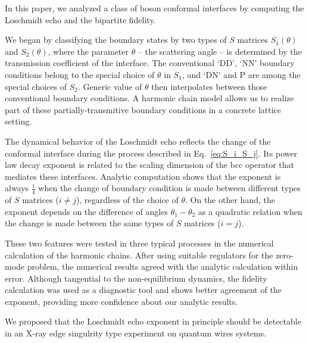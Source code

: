 
In this paper, we analyzed a class of boson conformal interfaces by computing the Loschmidt echo and the bipartite fidelity. 

We began by classifying the boundary states by two types of $S$ matrices $S_1(\theta)$ and $S_2(\theta)$, where the parameter $\theta$ -- the scattering angle -- is determined by the transmission coefficient of the interface. The conventional `DD', `NN' boundary conditions belong to the special choice of $\theta$ in $S_1$, and `DN' and P are among the special choices of $S_2$. Generic value of $\theta$ then interpolates between those conventional boundary conditions. A harmonic chain model allows us to realize part of these partially-transmitive boundary conditions in a concrete lattice setting. 

The dynamical behavior of the Loschmidt echo reflects the change of the conformal interface during the process described in Eq.~\eqref{eq:S_i_S_j}.
Its power law decay exponent is related to the scaling dimension of the bcc operator that mediates these interfaces. Analytic computation shows that the exponent is always $\frac{1}{4}$ when the change of boundary condition is made between different types of $S$ matrices ($i \ne j$), regardless of the choice of $\theta$. On the other hand, the exponent depends on the difference of angles $\theta_1 - \theta_2$ as a quadratic relation when the change is made between the same types of $S$ matrices ($i = j$).

These two features were tested in three typical processes in the numerical calculation of the harmonic chains. After using suitable regulators for the zero-mode problem, the numerical results agreed with the analytic calculation within error. Although tangential to the non-equilibrium dynamics, the fidelity calculation was used as a diagnostic tool and shows better agreement of the exponent, providing more confidence about our analytic results. 

We proposed that the Loschmidt echo exponent in principle should be detectable in an X-ray edge singulrity type experiment on quantum wires systems. 

